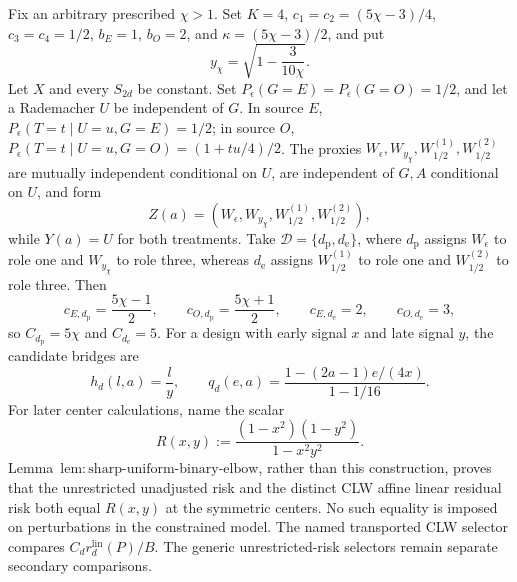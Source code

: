 Fix an arbitrary prescribed \(\chi>1\). Set \(K=4\), \(c_1=c_2=(5\chi-3)/4\), \(c_3=c_4=1/2\), \(b_E=1\), \(b_O=2\), and \(\kappa=(5\chi-3)/2\), and put
\[
 y_{\chi}=\sqrt{1-\frac{3}{10\chi}}.
\]
Let \(X\) and every \(S_{2d}\) be constant. Set \(P_{\epsilon}(G=E)=P_{\epsilon}(G=O)=1/2\), and let a Rademacher \(U\) be independent of \(G\). In source \(E\), \(P_{\epsilon}(T=t\mid U=u,G=E)=1/2\); in source \(O\), \(P_{\epsilon}(T=t\mid U=u,G=O)=(1+tu/4)/2\). The proxies \(W_{\epsilon},W_{y_{\chi}},W_{1/2}^{(1)},W_{1/2}^{(2)}\) are mutually independent conditional on \(U\), are independent of \(G,A\) conditional on \(U\), and form
\[
 Z(a)=(W_{\epsilon},W_{y_{\chi}},W_{1/2}^{(1)},W_{1/2}^{(2)}),
\]
while \(Y(a)=U\) for both treatments. Take \(\mathcal D=\{d_{\mathrm p},d_{\mathrm e}\}\), where \(d_{\mathrm p}\) assigns \(W_{\epsilon}\) to role one and \(W_{y_{\chi}}\) to role three, whereas \(d_{\mathrm e}\) assigns \(W_{1/2}^{(1)}\) to role one and \(W_{1/2}^{(2)}\) to role three. Then
\[
 c_{E,d_{\mathrm p}}=\frac{5\chi-1}{2},\qquad
 c_{O,d_{\mathrm p}}=\frac{5\chi+1}{2},\qquad
 c_{E,d_{\mathrm e}}=2,\qquad c_{O,d_{\mathrm e}}=3,
\]
so \(C_{d_{\mathrm p}}=5\chi\) and \(C_{d_{\mathrm e}}=5\). For a design with early signal \(x\) and late signal \(y\), the candidate bridges are
\[
 h_d(l,a)=\frac{l}{y},
 \qquad
 q_d(e,a)=\frac{1-(2a-1)e/(4x)}{1-1/16}.
\]
For later center calculations, name the scalar
\[
 R(x,y):=\frac{(1-x^2)(1-y^2)}{1-x^2y^2}.                 \tag{1}
\]
Lemma~\(\mathrm{lem{:}sharp\text{-}uniform\text{-}binary\text{-}elbow}\), rather than this construction, proves that the unrestricted unadjusted risk and the distinct CLW affine linear residual risk both equal \(R(x,y)\) at the symmetric centers.  No such equality is imposed on perturbations in the constrained model.  The named transported CLW selector compares \(C_dr_d^{\mathrm{lin}}(P)/B\).  The generic unrestricted-risk selectors remain separate secondary comparisons.

